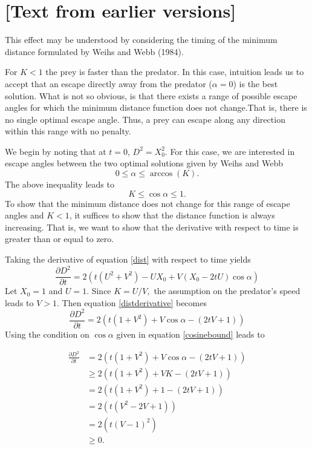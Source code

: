 \documentclass[12pt]{article}
\def\d{\partial}
\begin{document}
\section{[Text from earlier versions]}


This effect may be understood by considering the timing of the minimum distance formulated by Weihs and Webb (1984). 

For $K<1$ the prey is faster than the predator. In this case, intuition leads us to accept that an escape directly away from the predator ($\alpha =0$) is the best solution. What is not so obvious, is that there exists a range of possible escape angles for which the minimum distance function does not change.That is, there is no single optimal escape angle. Thus, a prey can escape along any direction within this range with no penalty.

We begin by noting that at $t=0$, $D^2 = X_0^2.$ For this case, we are interested in escape angles between the two optimal solutions given by Weihs and Webb
%
\begin{equation}
0 \leq \alpha \leq \arccos(K).
\label{anglerange}
\end{equation}
The above inequality leads to 
\begin{equation}
K \leq \cos\alpha \leq 1.
\label{cosinebound}
\end{equation}      
%
To show that the minimum distance does not change for this range of escape angles and $K<1$, it suffices to show that the distance function is always increasing. That is, we want to show that the derivative with respect to time is greater than or equal to zero. 

Taking the derivative of equation \eqref{dist} with respect to time yields
%
\begin{equation}
\frac{\d D^2}{\d t}  = 2(t(U^2+V^2) - UX_0 + V(X_0-2tU)\cos\alpha)
\label{distderivative}
\end{equation}  
%
Let $X_0=1$ and $U=1$. Since $K = U/V,$ the assumption on the predator's speed leads to $V > 1.$ 
Then equation \eqref{distderivative} becomes
%
\begin{equation}
\frac{\d D^2}{\d t}  = 2(t(1+V^2) +V\cos\alpha - (2tV + 1))
\label{distderivative2}
\end{equation}
%
Using the condition on $\cos\alpha$ given in equation \eqref{cosinebound} leads to

\begin{align*}
\frac{\d D^2}{\d t}  & = 2(t(1+V^2) +V\cos\alpha - (2tV + 1)) \\
& \geq 2(t(1+V^2) +VK - (2tV + 1)) \\
& = 2(t(1+V^2) +1 - (2tV + 1)) \\
& = 2(t(V^2- 2V + 1)) \\
& =2(t(V-1)^2)\\
& \geq 0.
\end{align*}
\end{document}
